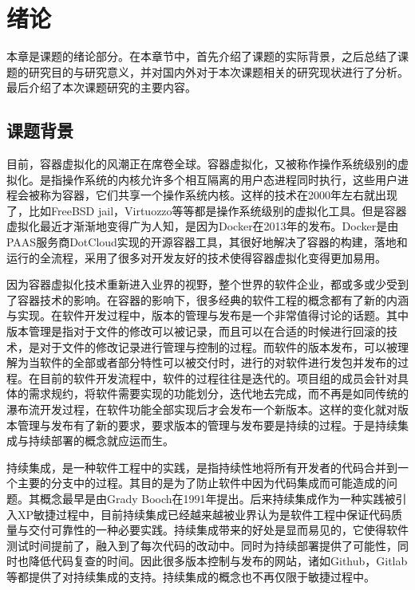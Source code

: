 
\chapter{绪论}
\label{chap:intro}

本章是课题的绪论部分。在本章节中，首先介绍了课题的实际背景，之后总结了课题的研究目的与研究意义，并对国内外对于本次课题相关的研究现状进行了分析。最后介绍了本次课题研究的主要内容。

\section{课题背景}

目前，容器虚拟化的风潮正在席卷全球。容器虚拟化，又被称作操作系统级别的虚拟化。是指操作系统的内核允许多个相互隔离的用户态进程同时执行，这些用户进程会被称为容器，它们共享一个操作系统内核。这样的技术在2000年左右就出现了，比如FreeBSD jail，Virtuozzo等等都是操作系统级别的虚拟化工具。但是容器虚拟化最近才渐渐地变得广为人知，是因为Docker在2013年的发布。Docker是由PAAS服务商DotCloud实现的开源容器工具，其很好地解决了容器的构建，落地和运行的全流程，采用了很多对开发友好的技术使得容器虚拟化变得更加易用。

因为容器虚拟化技术重新进入业界的视野，整个世界的软件企业，都或多或少受到了容器技术的影响。在容器的影响下，很多经典的软件工程的概念都有了新的内涵与实现。在软件开发过程中，版本的管理与发布是一个非常值得讨论的话题。其中版本管理是指对于文件的修改可以被记录，而且可以在合适的时候进行回滚的技术，是对于文件的修改记录进行管理与控制的过程。而软件的版本发布，可以被理解为当软件的全部或者部分特性可以被交付时，进行的对软件进行发包并发布的过程。在目前的软件开发流程中，软件的过程往往是迭代的。项目组的成员会针对具体的需求规约，将软件需要实现的功能划分，迭代地去完成，而不再是如同传统的瀑布流开发过程，在软件功能全部实现后才会发布一个新版本。这样的变化就对版本管理与发布有了新的要求，要求版本的管理与发布要是持续的过程。于是持续集成与持续部署的概念就应运而生。

持续集成，是一种软件工程中的实践，是指持续性地将所有开发者的代码合并到一个主要的分支中的过程。其目的是为了防止软件中因为代码集成而可能造成的问题。其概念最早是由Grady Booch在1991年提出\supercite{Booch}。后来持续集成作为一种实践被引入XP敏捷过程中，目前持续集成已经越来越被业界认为是软件工程中保证代码质量与交付可靠性的一种必要实践。持续集成带来的好处是显而易见的，它使得软件测试时间提前了，融入到了每次代码的改动中。同时为持续部署提供了可能性，同时也降低代码复查的时间。因此很多版本控制与发布的网站，诸如Github，Gitlab等都提供了对持续集成的支持。持续集成的概念也不再仅限于敏捷过程中。

